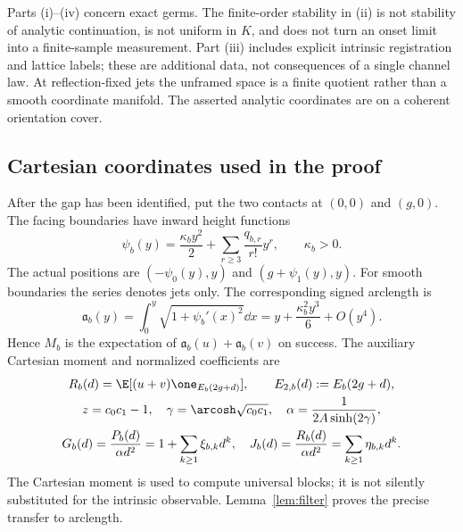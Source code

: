 Parts (i)--(iv) concern exact germs. The finite-order stability in
(ii) is not stability of analytic continuation, is not uniform in $K$,
and does not turn an onset limit into a finite-sample measurement.
Part (iii) includes explicit intrinsic registration and lattice labels;
these are additional data, not consequences of a single channel law.
At reflection-fixed jets the unframed space is a finite quotient rather
than a smooth coordinate manifold. The asserted analytic coordinates
are on a coherent orientation cover.

\subsection{Cartesian coordinates used in the proof}
After the gap has been identified, put the two contacts at $(0,0)$ and
$(g,0)$. The facing boundaries have inward height functions
\begin{equation}\label{eq:graphs}
 \psi_b(y)=\frac{\kappa_by^2}{2}
       +\sum_{r\ge3}\frac{q_{b,r}}{r!}y^r,\qquad \kappa_b>0.
\end{equation}
The actual positions are $(-\psi_0(y),y)$ and
$(g+\psi_1(y),y)$. For smooth boundaries the series denotes jets only.
The corresponding signed arclength is
\begin{equation}\label{eq:arcmap}
 \mathfrak a_b(y)=\int_0^y\sqrt{1+\psi_b'(x)^2}\dd x
       =y+\frac{\kappa_b^2y^3}{6}+O(y^4).
\end{equation}
Hence $M_b$ is the expectation of $\mathfrak a_b(u)+\mathfrak a_b(v)$ on success.
The auxiliary Cartesian moment and normalized coefficients are
\begin{gather}
 R_b(d)=\E[(u+v)\one_{E_b(2g+d)}],\qquad
 E_{2,b}(d):=E_b(2g+d),\label{eq:rawdata}\\
 z=c_0c_1-1,\quad \gamma=\arcosh\sqrt{c_0c_1},\quad
 \alpha=\frac1{2A\sinh(2\gamma)},\label{eq:leading}\\
 G_b(d)=\frac{P_b(d)}{\alpha d^2}=1+\sum_{k\ge1}\xi_{b,k}d^k,
 \quad J_b(d)=\frac{R_b(d)}{\alpha d^2}=\sum_{k\ge1}\eta_{b,k}d^k.
 \label{eq:coefficients}
\end{gather}
The Cartesian moment is used to compute universal blocks; it is not
silently substituted for the intrinsic observable. Lemma~\ref{lem:filter}
proves the precise transfer to arclength.

